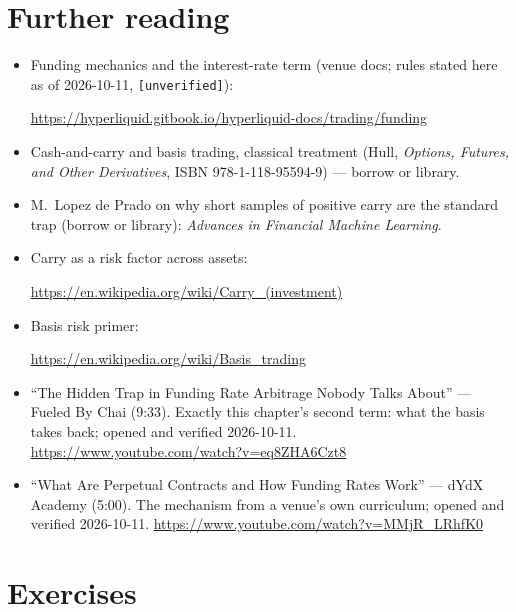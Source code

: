\section*{Further reading}
\begin{itemize}
\item Funding mechanics and the interest-rate term (venue docs;
rules stated here as of 2026-10-11, \texttt{[unverified]}):

\url{https://hyperliquid.gitbook.io/hyperliquid-docs/trading/funding}
\item Cash-and-carry and basis trading, classical treatment
(Hull, \emph{Options, Futures, and Other Derivatives},
ISBN 978-1-118-95594-9) --- borrow or library.
\item M.~Lopez de Prado on why short samples of positive carry
are the standard trap (borrow or library):
\emph{Advances in Financial Machine Learning}.
\item Carry as a risk factor across assets:

\url{https://en.wikipedia.org/wiki/Carry_(investment)}
\item Basis risk primer:

\url{https://en.wikipedia.org/wiki/Basis_trading}
\end{itemize}

\begin{rulebox}
\begin{itemize}
\item ``The Hidden Trap in Funding Rate Arbitrage Nobody Talks
About'' --- Fueled By Chai (9:33). Exactly this chapter's
second term: what the basis takes back; opened and verified
2026-10-11.
\url{https://www.youtube.com/watch?v=eq8ZHA6Czt8}
\item ``What Are Perpetual Contracts and How Funding Rates
Work'' --- dYdX Academy (5:00). The mechanism from a venue's
own curriculum; opened and verified 2026-10-11.
\url{https://www.youtube.com/watch?v=MMjR_LRhfK0}
\end{itemize}
\end{rulebox}

\section*{Exercises}
